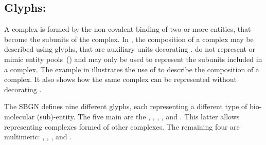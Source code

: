 \subsection{Glyphs: }
\label{sec:subunit}

A complex is formed by the non-covalent binding of two or more entities, that become the subunits of the complex.
In \PD, the composition of a complex may be described using  glyphs, that are auxiliary units decorating .
 do not represent or mimic entity pools~() and may only be used to represent the subunits included in a complex.
The example in  illustrates the use of  to describe the composition of a complex.
It also shows how the same complex can be represented without decorating .

The SBGN \PD defines nine different  glyphs, each representing a different type of bio-molecular (sub)-entity.
The five main  are the , , , , and .
This latter  allows representing complexes formed of other complexes.
The remaining four  are multimeric: , , , and .

